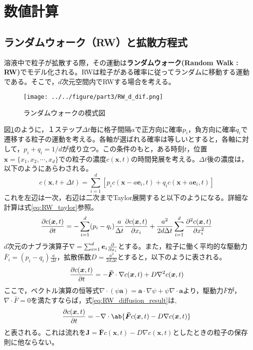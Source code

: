 \documentclass[autodetect-engine,dvi=dvipdfmx,a4paper,ja=standard,oneside,openany,11pt]{bxjsbook}
\begin{document}
\section{数値計算}
\subsection{ランダムウォーク（RW）と拡散方程式}
\label{sec:RW}
溶液中で粒子が拡散する際，その運動は\textbf{ランダムウォーク(Random Walk : RW)}でモデル化される。RWは粒子がある確率に従ってランダムに移動する運動である。そこで，$d$次元空間内でRWする場合を考える。
\begin{figure}[htbp]
  \centering
  \texttt{[image: ../../figure/part3/RW\_d\_dif.png]}
  \caption{ランダムウォークの模式図}
  \label{fig:random_walk}
\end{figure}
図\ref{fig:random_walk}のように，１ステップ$\Delta t$毎に格子間隔$a$で正方向に確率$p_i$，負方向に確率$q_i$で遷移する粒子の運動を考える。各軸が選ばれる確率は等しいとすると，各軸に対して，$p_i+q_i=1/d$が成り立つ。この条件のもと，ある時刻$t$，位置$\bm{x}=\{x_1,x_2,\cdots,x_d\}$での粒子の濃度$c(\bm{x},t)$の時間発展を考える。$\Delta t$後の濃度は，以下のようにあらわされる。
\begin{equation}
  c(\bm{x},t+\Delta t)=\sum_{i=1}^{d}\left[p_i c(\bm{x}-a\bm{e}_i,t)+q_i c(\bm{x}+a\bm{e}_i,t)\right]
  \label{eq:RW}
\end{equation}
これを左辺は一次，右辺は二次までTaylor展開すると以下のようになる。詳細な計算は式\ref{eq:RW_taylor}参照。
\begin{equation}
  \pdv{c(\bm{x},t)}{t}=-\sum_{i=1}^{d}(p_i-q_i)\frac{a}{\Delta t}\pdv{c(\bm{x},t)}{x_i}+\frac{a^2}{2d\Delta t}\sum_{i=1}^{d}\pdv[2]{c(\bm{x},t)}{x_i}
  \label{eq:RW_diffusion}
\end{equation}
$d$次元のナブラ演算子$\nabla=\sum_{i=1}^{d}\bm{e}_i\pdv*{}{x_i}$とする。また，粒子に働く平均的な駆動力$\bar{F}_i=(p_i-q_i)\frac{a}{\Delta t}$，拡散係数$D=\frac{a^2}{2d\Delta t}$とすると，以下のように表される。
\begin{equation}
  \pdv{c(\bm{x},t)}{t}=-\bm{\bar{F}}\cdot\nabla c(\bm{x},t)+D\nabla^2 c(\bm{x},t)
  \label{eq:RW_diffusion_result}
\end{equation}
ここで，ベクトル演算の恒等式$\nabla\cdot(\psi\bm{a})=\bm{a}\cdot\nabla\psi+\psi\nabla\cdot\bm{a}$より，駆動力$\bar{F}$が，$\nabla\cdot\bar{F}=0$を満たすならば，式\ref{eq:RW_diffusion_result}は,
\begin{equation}
  \pdv{c(\bm{x},t)}{t}=-\nabla\cdot\ab\{\bm{\bar{F}}c(\bm{x},t)-D\nabla c(\bm{x},t)\}
  \label{eq:RW_diffusion_result_divergence}
\end{equation}
と表される。これは流れを$\bm{J}=\bm{\bar{F}}c(\bm{x},t)-D\nabla c(\bm{x},t)$としたときの粒子の保存則に他ならない。
\end{document}
